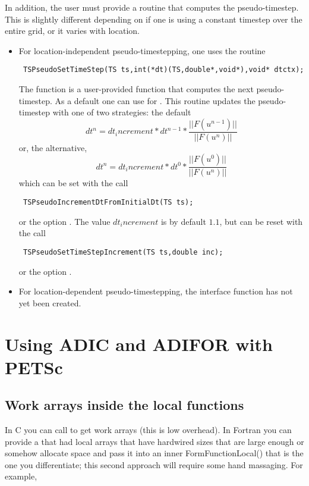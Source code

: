 In addition, the user must provide a routine that computes the 
pseudo-timestep. This is slightly different depending on if 
one is using a constant timestep over the entire grid, or it varies
with location. 
\begin{itemize}
\item For location-independent pseudo-timestepping, one uses the routine 
\begin{verbatim}
 TSPseudoSetTimeStep(TS ts,int(*dt)(TS,double*,void*),void* dtctx);
\end{verbatim}
The function  is a user-provided function that computes the next 
pseudo-timestep. As a default one can use
 for . This routine
updates the pseudo-timestep with one of two strategies: the default
\[
   dt^{n} = dt_increment*dt^{n-1}*\frac{|| F(u^{n-1}) ||}{|| F(u^{n})||}
\]
or, the alternative, 
\[
   dt^{n} = dt_increment*dt^{0}*\frac{|| F(u^{0}) ||}{|| F(u^{n})||}
\]
which can be set with the call
\begin{verbatim}
 TSPseudoIncrementDtFromInitialDt(TS ts);
\end{verbatim}
or  
the option . 
The value $ dt_increment $ is by default $ 1.1$, but can be reset with the 
call 
\begin{verbatim}
 TSPseudoSetTimeStepIncrement(TS ts,double inc); 
\end{verbatim}
or  the option 
. 


\item For location-dependent pseudo-timestepping, the interface function
      has not yet been created.
\end{itemize}


\chapter{Using ADIC and ADIFOR with PETSc}

\section{Work arrays inside the local functions} In C you can call  to get 
work arrays (this is low overhead). In Fortran you can provide a 
that had local arrays that have hardwired sizes that are large enough or somehow allocate
space and pass it into an inner FormFunctionLocal() that is the one you differentiate; this
second approach will require some hand massaging. For example,

